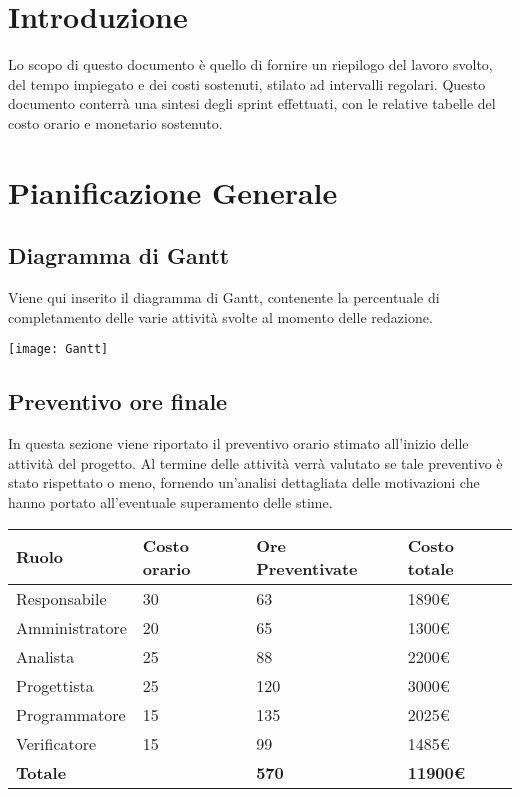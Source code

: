 \documentclass[12pt]{article}
\begin{document}
\section{Introduzione}
Lo scopo di questo documento è quello di fornire un riepilogo del lavoro svolto, del tempo impiegato e dei costi sostenuti, stilato ad intervalli regolari.
Questo documento conterrà una sintesi degli sprint effettuati, con le relative tabelle del costo orario e monetario sostenuto.

\section{Pianificazione Generale}
\subsection{Diagramma di Gantt}
Viene qui inserito il diagramma di Gantt, contenente la percentuale di completamento delle varie attività svolte al momento delle redazione.
\begin{center}
\texttt{[image: Gantt]}
\end{center}


\subsection{Preventivo ore finale}
In questa sezione viene riportato il preventivo orario stimato all'inizio delle attività del progetto. Al termine delle attività verrà valutato se tale preventivo è stato rispettato o meno, fornendo un'analisi dettagliata delle motivazioni che hanno portato all'eventuale superamento delle stime.
\begin{center}  
    \begin{tabular}{|l|l|l|l|}
        \hline
        \textbf{Ruolo} & \textbf{Costo orario} & \textbf{Ore Preventivate} & \textbf{Costo totale}\\
        \hline
        Responsabile & 30 & 63 & 1890\euro  \\ 
        \hline
        Amministratore & 20 & 65 & 1300\euro \\
        \hline
        Analista & 25 & 88 & 2200\euro \\
        \hline
        Progettista & 25 & 120 & 3000\euro \\
        \hline
        Programmatore & 15 & 135 & 2025\euro \\
        \hline
        Verificatore & 15 & 99 & 1485\euro \\
        \hline
        \textbf{Totale} &  & \textbf{570} & \textbf{11900\euro} \\
        \hline
    \end{tabular}
\end{center}
\end{document}
